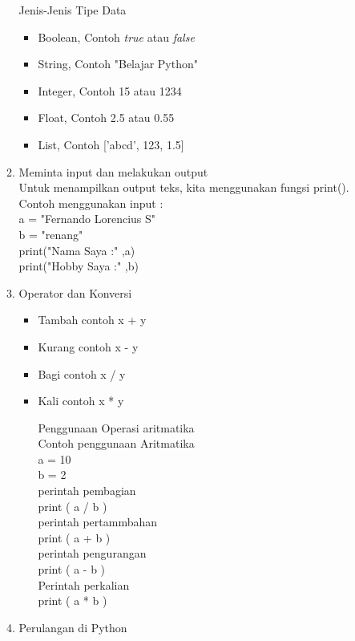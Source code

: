 \begin{enumerate}
\begin{enumerate}
Jenis-Jenis Tipe Data\\
\begin{itemize}
\item Boolean, Contoh \textit{true} atau \textit{false}
\item String, Contoh "Belajar Python"
\item Integer, Contoh 15 atau 1234
\item Float, Contoh 2.5 atau 0.55
\item List, Contoh ['abcd', 123, 1.5]
\end{itemize}
\item Meminta input dan melakukan output\\
Untuk menampilkan output teks, kita menggunakan fungsi print().\\
Contoh menggunakan input :\\
a = "Fernando Lorencius S"\\
b = "renang"\\

print("Nama Saya :" ,a)\\
print("Hobby Saya :" ,b)\\

\item Operator dan Konversi
\begin{itemize}

\item Tambah contoh x + y
\item Kurang contoh x - y
\item Bagi contoh x / y
\item Kali contoh x * y

Penggunaan Operasi aritmatika\\
Contoh penggunaan Aritmatika\\
a = 10\\
b = 2\\

perintah pembagian\\
print ( a / b )\\
perintah pertammbahan\\
print ( a + b )\\
perintah pengurangan\\
print ( a - b )\\
Perintah perkalian\\
print ( a * b )\\

\end{itemize}
\item Perulangan di Python


\end{enumerate}
\end{enumerate}
